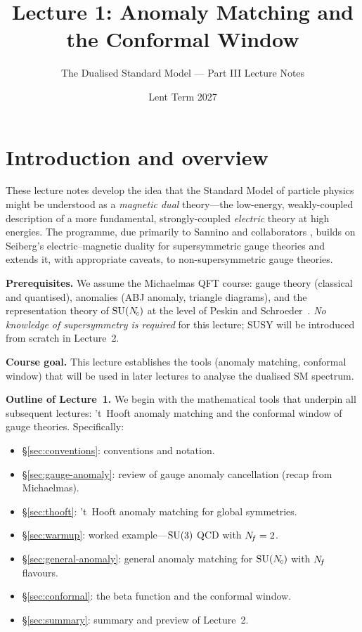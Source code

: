\documentclass[11pt,a4paper]{article}
\title{\textbf{Lecture 1: Anomaly Matching and the Conformal Window}}
\author{The Dualised Standard Model --- Part III Lecture Notes}
\date{Lent Term 2027}
\begin{document}
\maketitle

\tableofcontents
\newpage

\section{Introduction and overview}
\label{sec:intro}

These lecture notes develop the idea that the Standard Model of particle
physics might be understood as a \emph{magnetic dual} theory---the
low-energy, weakly-coupled description of a more fundamental, strongly-coupled
\emph{electric} theory at high energies.  The programme, due primarily to
Sannino and collaborators \cite{Sannino2024}, builds on Seiberg's
electric--magnetic duality for supersymmetric gauge theories
\cite{Seiberg1995} and extends it, with appropriate caveats, to
non-supersymmetric gauge theories.

\textbf{Prerequisites.}  We assume the Michaelmas QFT course: gauge theory
(classical and quantised), anomalies (ABJ anomaly, triangle diagrams), and
the representation theory of $\mathrm{SU}(N_{\!c})$ at the level of Peskin and
Schroeder~\cite{PS1995}.  \emph{No knowledge of supersymmetry is required}
for this lecture; SUSY will be introduced from scratch in Lecture~2.

\textbf{Course goal.}  This lecture establishes the tools (anomaly
matching, conformal window) that will be used in later lectures to
analyse the dualised SM spectrum.

\textbf{Outline of Lecture~1.}  We begin with the mathematical tools that
underpin all subsequent lectures: 't~Hooft anomaly matching and the
conformal window of gauge theories.  Specifically:
\begin{itemize}
  \item \S\ref{sec:conventions}: conventions and notation.
  \item \S\ref{sec:gauge-anomaly}: review of gauge anomaly cancellation (recap from Michaelmas).
  \item \S\ref{sec:thooft}: 't~Hooft anomaly matching for global symmetries.
  \item \S\ref{sec:warmup}: worked example---$\mathrm{SU}(3)$ QCD with $N_{\!f} = 2$.
  \item \S\ref{sec:general-anomaly}: general anomaly matching for $\mathrm{SU}(N_{\!c})$ with $N_{\!f}$ flavours.
  \item \S\ref{sec:conformal}: the beta function and the conformal window.
  \item \S\ref{sec:summary}: summary and preview of Lecture~2.
\end{itemize}
\end{document}
